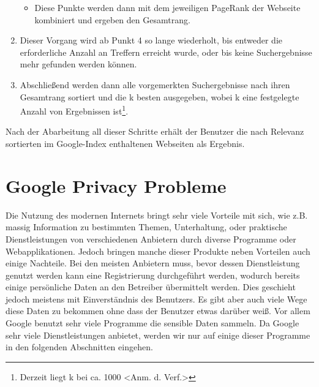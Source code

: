 \documentclass[12pt, a4paper]{llncs}
\begin{document}
\begin{enumerate}
\begin{itemize}
		\item Diese Punkte werden dann mit dem jeweiligen PageRank der Webseite kombiniert und ergeben den Gesamtrang.
	\end{itemize}
	\item Dieser Vorgang wird ab Punkt 4 so lange wiederholt, bis entweder die erforderliche Anzahl an Treffern erreicht wurde, oder bis keine Suchergebnisse mehr gefunden
		werden können.
	\item Abschließend werden dann alle vorgemerkten Suchergebnisse nach ihren Gesamtrang sortiert und die k besten ausgegeben, wobei k eine festgelegte Anzahl von Ergebnissen
		ist\footnote{Derzeit liegt k bei ca. 1000 \textless Anm. d. Verf.\textgreater}.
	\end{enumerate}
	Nach der Abarbeitung all dieser Schritte erhält der Benutzer die nach Relevanz sortierten im Google-Index enthaltenen Webseiten als Ergebnis.
	
	\section{Google Privacy Probleme}

	Die Nutzung des modernen Internets bringt sehr viele Vorteile mit sich, wie z.B. massig Information zu bestimmten Themen, Unterhaltung, oder praktische Dienstleistungen von verschiedenen Anbietern durch diverse Programme oder Webapplikationen. Jedoch bringen manche dieser Produkte neben Vorteilen auch einige Nachteile. Bei den meisten Anbietern muss, bevor dessen Dienstleistung genutzt werden kann eine Registrierung durchgeführt werden, wodurch bereits einige persönliche Daten an den Betreiber übermittelt werden. Dies geschieht jedoch meistens mit Einverständnis des Benutzers. Es gibt aber auch viele Wege diese Daten zu bekommen ohne dass der Benutzer etwas darüber weiß. Vor allem Google benutzt sehr viele Programme die sensible Daten sammeln. Da Google sehr viele Dienstleistungen anbietet, werden wir nur auf einige dieser Programme in den folgenden Abschnitten eingehen.
	
\end{document}
